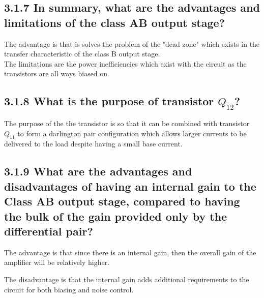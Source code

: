\documentclass[12pt]{article}
\begin{document}
\subsection*{3.1.7 In summary, what are the advantages and limitations of the class AB output stage?}

The advantage is that is solves the problem of the "dead-zone" which exists in the transfer characteristic of the class B output stage. \\

The limitations are the power inefficiencies which exist with the circuit as the transistors are all ways biased on. 

\subsection*{3.1.8 What is the purpose of transistor $Q_{12}$?}

The purpose of the the transistor is so that it can be combined with transistor $Q_11$ to form a darlington pair configuration which allows larger currents to be delivered to the load despite having a small base current.

\subsection*{3.1.9 What are the advantages and disadvantages of having an internal gain to the Class AB output stage, compared to having the bulk of the gain provided only by the differential pair?   }

The advantage is that since there is an internal gain, then the overall gain of the amplifier will be relatively higher. 

The disadvantage is that the internal gain adds additional requirements to the circuit for both biasing and noise control.
\end{document}
